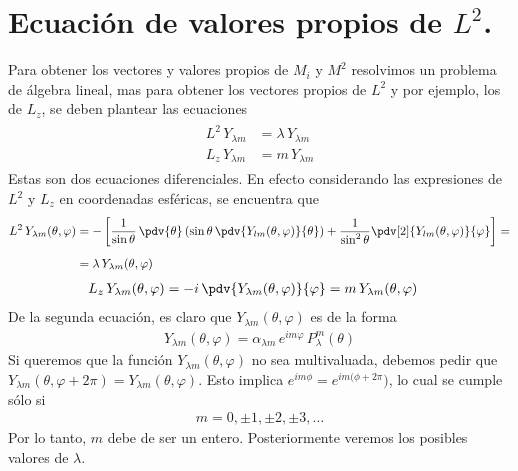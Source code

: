 \section{Ecuación de valores propios de $L^{2}$.}
Para obtener los vectores y valores propios de $M_{i}$ y $M^{2}$ resolvimos un problema de álgebra lineal, mas para obtener los vectores propios de $L^{2}$ y por ejemplo, los de $L_{z}$, se deben plantear las ecuaciones
\begin{align}
\begin{aligned}
L^{2} \, Y_{\lambda m} &= \lambda \, Y_{\lambda m} \\[0.5em]
L_{z} \, Y_{\lambda m} &= m \, Y_{\lambda m}
\end{aligned}
\label{eq:ecuacion_10_110}
\end{align}
Estas son dos ecuaciones diferenciales. En efecto considerando las expresiones de $L^{2}$ y $L_{z}$ en coordenadas esféricas, se encuentra que
\begin{align}
L^{2} \, Y_{\lambda m} (\theta, \varphi) &= - \left[ \dfrac{1}{\sin \theta} \, \pdv{\theta} \left( \sin \theta \, \pdv{Y_{lm} (\theta, \varphi)}{\theta} \right) + \dfrac{1}{\sin^{2} \theta} \pdv[2]{Y_{lm} (\theta, \varphi)}{\varphi}  \right] = \nonumber \\[0.5em]
&= \lambda \, Y_{\lambda m} (\theta, \varphi) \label{eq:ecuacion_10_111}
\end{align}
\begin{align}
L_{z} \, Y_{\lambda m} (\theta, \varphi) &= - i \, \pdv{Y_{\lambda m} (\theta, \varphi)}{\varphi} = m \, Y_{\lambda m} (\theta, \varphi) \label{eq:ecuacion_10_112}
\end{align}
De la segunda ecuación, es claro que $Y_{\lambda m} (\theta, \varphi)$ es de la forma
\begin{align}
Y_{\lambda m} (\theta, \varphi) = \alpha_{\lambda m} \, e^{i m \varphi} \, P_{\lambda}^{m} (\theta)
\label{eq:ecuacion_10_113}
\end{align}
Si queremos que la función $Y_{\lambda m} (\theta, \varphi) $ no sea multivaluada, debemos pedir que $Y_{\lambda m} (\theta, \varphi + 2 \pi) = Y_{\lambda m} (\theta, \varphi)$. Esto implica $e^{i m \phi} = e^{i m (\phi + 2\pi})$, lo cual se cumple sólo si
\begin{align}
m = 0, \pm 1, \pm 2, \pm 3, \ldots
\label{eq:ecuacion_10_114}
\end{align}
Por lo tanto, $m$ debe de ser un entero. Posteriormente veremos los posibles valores de $\lambda$.
\par
